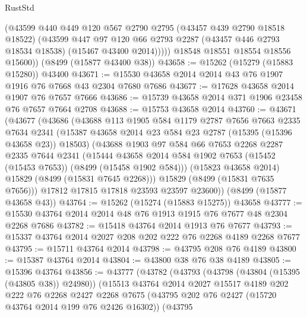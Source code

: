 \begin{lexlean}{RustStd}
\begin{coremodule}
            (@43599
              @440
              @449
              @120
              @567
              @2790
              @2795
              (@43457 @439 @2790 @18518 @18522)
              (@43599
                @447
                @97
                @120
                @66
                @2793
                @2287
                (@43457 @446 @2793 @18534 @18538)
                (@15467 @43400 @2014)))))
        @18548
        @18551
        @18554
        @18556
        @15600))
    (@8499 (@15877 @43400 @38))
@43658 := @15262 (@15279 (@15883 @15280)) @43400
@43671 := @15530 @43658 @2014 @2014 @43 @76 @1907 @1916 @76 @7668 @43 @2304 @7680 @7686
@43677 := @17628 @43658 @2014 @1907 @76 @7657 @7666
@43686 := @15739 @43658 @2014 @371 @1906 @23458 @76 @7657 @7664 @2708
@43688 := @15753 @43658 @2014
@43760 := @43671
    (@43677
      (@43686
        (@43688
          @113
          @1905
          @584
          @1179
          @2787
          @7656
          @7663
          @2335
          @7634
          @2341
          (@15387 @43658 @2014 @23 @584 @23 @2787 (@15395 (@15396 @43658 @23)) @18503)
          (@43688
            @1903
            @97
            @584
            @66
            @7653
            @2268
            @2287
            @2335
            @7644
            @2341
            (@15444
              @43658
              @2014
              @584
              @1902
              @7653
              (@15452 (@15453 @7653))
              (@8499 (@15458 @1902 @584)))
            (@15823 @43658 @2014)
            @15829
            (@8499 (@15831 @7645 @2268)))
          @15829
          (@8499 (@15831 @7635 @7656)))
        @17812
        @17815
        @17818
        @23593
        @23597
        @23600))
    (@8499 (@15877 @43658 @43))
@43764 := @15262 (@15274 (@15883 @15275)) @43658
@43777 := @15530 @43764 @2014 @2014 @48 @76 @1913 @1915 @76 @7677 @48 @2304 @2268 @7686
@43782 := @15418 @43764 @2014 @1913 @76 @7677
@43793 := @15337 @43764 @2014 @2027 @208 @202 @222 @76 @2268 @4189 @2268 @7677
@43795 := @15711 @43764 @2014
@43798 := @43795 @208 @76 @4189
@43800 := @15387 @43764 @2014
@43804 := @43800 @38 @76 @38 @4189
@43805 := @15396 @43764
@43856 := @43777
    (@43782
      (@43793
        (@43798 (@43804 (@15395 (@43805 @38)) @24980))
        (@15513
          @43764
          @2014
          @2027
          @15517
          @4189
          @202
          @222
          @76
          @2268
          @2427
          @2268
          @7675
          (@43795 @202 @76 @2427 (@15720 @43764 @2014 @199 @76 @2426 @16302))
          (@43795

\end{coremodule}
\end{lexlean}

